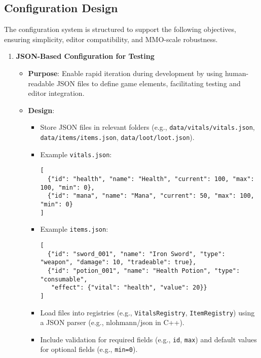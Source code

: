 \subsection{Configuration Design}
The configuration system is structured to support the following objectives, ensuring simplicity, editor compatibility, and MMO-scale robustness.

\begin{enumerate}
    \item \textbf{JSON-Based Configuration for Testing}
        \begin{itemize}
            \item \textbf{Purpose}: Enable rapid iteration during development by using human-readable JSON files to define game elements, facilitating testing and editor integration.
            \item \textbf{Design}:
                \begin{itemize}
                    \item Store JSON files in relevant folders (e.g., \texttt{data/vitals/vitals.json}, \texttt{data/items/items.json}, \texttt{data/loot/loot.json}).
                    \item Example \texttt{vitals.json}:
                    \begin{lstlisting}[style=htmlstyle]
[
  {"id": "health", "name": "Health", "current": 100, "max": 100, "min": 0},
  {"id": "mana", "name": "Mana", "current": 50, "max": 100, "min": 0}
]
                    \end{lstlisting}
                    \item Example \texttt{items.json}:
                    \begin{lstlisting}[style=htmlstyle]
[
  {"id": "sword_001", "name": "Iron Sword", "type": "weapon", "damage": 10, "tradeable": true},
  {"id": "potion_001", "name": "Health Potion", "type": "consumable", 
   "effect": {"vital": "health", "value": 20}}
]
                    \end{lstlisting}
                    \item Load files into registries (e.g., \texttt{VitalsRegistry}, \texttt{ItemRegistry}) using a JSON parser (e.g., nlohmann/json in C++).
                    \item Include validation for required fields (e.g., \texttt{id}, \texttt{max}) and default values for optional fields (e.g., \texttt{min=0}).
                \end{itemize}
        \end{itemize}


\end{enumerate}

